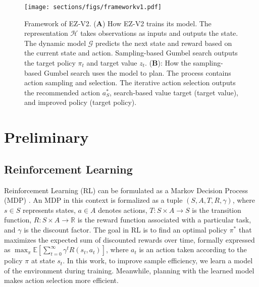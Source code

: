 \begin{figure*}[t]
\centering
\texttt{[image: sections/figs/frameworkv1.pdf]}
\caption{Framework of EZ-V2. (\textbf{A}) How EZ-V2 trains its model. The representation \(\mathcal{H}\) takes observations as inputs and outputs the state. The dynamic model \(\mathcal{G}\) predicts the next state and reward based on the current state and action. Sampling-based Gumbel search outputs the target policy \(\pi_t\) and target value \(z_t\). (\textbf{B}): How the sampling-based Gumbel search uses the model to plan. The process contains action sampling and selection. The iterative action selection outputs the recommended action $a^*_S$, search-based value target (target value), and improved policy (target policy).}
\label{framework}
\end{figure*}


\section{Preliminary}

\subsection{Reinforcement Learning}
Reinforcement Learning (RL) can be formulated as a Markov Decision Process (MDP) \citep{bellman1957markovian}. An MDP in this context is formalized as a tuple \( (S, A, T, R, \gamma) \), where \( s \in S \) represents states, \( a \in A \) denotes actions, \( T: S \times A \rightarrow S \) is the transition function, \( R: S \times A \rightarrow \mathbb{R} \) is the reward function associated with a particular task, and \( \gamma \) is the discount factor. 
The goal in RL is to find an optimal policy \( \pi^* \) that maximizes the expected sum of discounted rewards over time, formally expressed as \( \max_\pi \mathbb{E} \left[ \sum_{t=0}^{\infty} \gamma^t R(s_t, a_t) \right] \), where \( a_t \) is an action taken according to the policy \( \pi \) at state \( s_t \). 
In this work, to improve sample efficiency, we learn a model of the environment during training. Meanwhile, planning with the learned model makes action selection more efficient.


